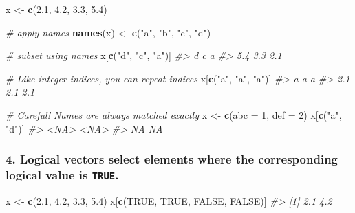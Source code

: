 \documentclass[]{book}
\newenvironment{Shaded}{\begin{snugshade}}{\end{snugshade}}
\newcommand{\CommentTok}[1]{\textcolor[rgb]{0.56,0.35,0.01}{\textit{#1}}}
\newcommand{\DataTypeTok}[1]{\textcolor[rgb]{0.13,0.29,0.53}{#1}}
\newcommand{\DecValTok}[1]{\textcolor[rgb]{0.00,0.00,0.81}{#1}}
\newcommand{\FloatTok}[1]{\textcolor[rgb]{0.00,0.00,0.81}{#1}}
\newcommand{\KeywordTok}[1]{\textcolor[rgb]{0.13,0.29,0.53}{\textbf{#1}}}
\newcommand{\NormalTok}[1]{#1}
\newcommand{\OtherTok}[1]{\textcolor[rgb]{0.56,0.35,0.01}{#1}}
\newcommand{\StringTok}[1]{\textcolor[rgb]{0.31,0.60,0.02}{#1}}
\begin{document}
\begin{Shaded}
\begin{Highlighting}[]
\NormalTok{x <-}\StringTok{ }\KeywordTok{c}\NormalTok{(}\FloatTok{2.1}\NormalTok{, }\FloatTok{4.2}\NormalTok{, }\FloatTok{3.3}\NormalTok{, }\FloatTok{5.4}\NormalTok{)}

\CommentTok{# apply names}
\KeywordTok{names}\NormalTok{(x) <-}\StringTok{ }\KeywordTok{c}\NormalTok{(}\StringTok{"a"}\NormalTok{, }\StringTok{"b"}\NormalTok{, }\StringTok{"c"}\NormalTok{, }\StringTok{"d"}\NormalTok{)}

\CommentTok{# subset using names}
\NormalTok{x[}\KeywordTok{c}\NormalTok{(}\StringTok{"d"}\NormalTok{, }\StringTok{"c"}\NormalTok{, }\StringTok{"a"}\NormalTok{)]}
\CommentTok{#>   d   c   a }
\CommentTok{#> 5.4 3.3 2.1}

\CommentTok{# Like integer indices, you can repeat indices}
\NormalTok{x[}\KeywordTok{c}\NormalTok{(}\StringTok{"a"}\NormalTok{, }\StringTok{"a"}\NormalTok{, }\StringTok{"a"}\NormalTok{)]}
\CommentTok{#>   a   a   a }
\CommentTok{#> 2.1 2.1 2.1}

\CommentTok{# Careful! Names are always matched exactly}
\NormalTok{x <-}\StringTok{ }\KeywordTok{c}\NormalTok{(}\DataTypeTok{abc =} \DecValTok{1}\NormalTok{, }\DataTypeTok{def =} \DecValTok{2}\NormalTok{)}
\NormalTok{x[}\KeywordTok{c}\NormalTok{(}\StringTok{"a"}\NormalTok{, }\StringTok{"d"}\NormalTok{)]}
\CommentTok{#> <NA> <NA> }
\CommentTok{#>   NA   NA}
\end{Highlighting}
\end{Shaded}

\hypertarget{logical-vectors-select-elements-where-the-corresponding-logical-value-is-true.}{%
\subsubsection*{\texorpdfstring{4. \textbf{Logical vectors} select elements where the corresponding logical value is \texttt{TRUE}.}{4. Logical vectors select elements where the corresponding logical value is TRUE.}}\label{logical-vectors-select-elements-where-the-corresponding-logical-value-is-true.}}

\begin{Shaded}
\begin{Highlighting}[]
\NormalTok{x <-}\StringTok{ }\KeywordTok{c}\NormalTok{(}\FloatTok{2.1}\NormalTok{, }\FloatTok{4.2}\NormalTok{, }\FloatTok{3.3}\NormalTok{, }\FloatTok{5.4}\NormalTok{)}
\NormalTok{x[}\KeywordTok{c}\NormalTok{(}\OtherTok{TRUE}\NormalTok{, }\OtherTok{TRUE}\NormalTok{, }\OtherTok{FALSE}\NormalTok{, }\OtherTok{FALSE}\NormalTok{)]}
\CommentTok{#> [1] 2.1 4.2}
\end{Highlighting}
\end{Shaded}
\end{document}
